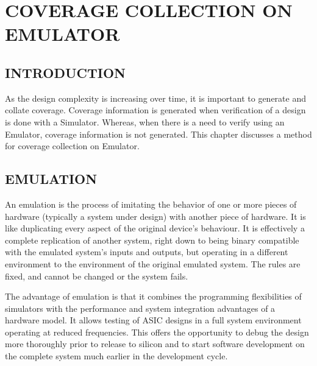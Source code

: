 \chapter{COVERAGE COLLECTION ON EMULATOR}
\label{chap:coverage_on_emulator}

\section{INTRODUCTION}
As the design complexity is increasing over time, it is important to generate and collate coverage. Coverage information is generated when verification of a design is done with a Simulator. Whereas, when there is a need to verify using an Emulator, coverage information is not generated. This chapter discusses a method for coverage collection on Emulator.
\section{EMULATION}
An emulation is the process of imitating the behavior of one or more pieces of hardware (typically a system under design) with another piece of hardware. It is like duplicating every aspect of the original device’s behaviour. It is effectively a complete replication of another system, right down to being binary compatible with the emulated system's inputs and outputs, but operating in a different environment to the environment of the original emulated system. The rules are fixed, and cannot be changed or the system fails.

The advantage of emulation is that it combines the programming flexibilities of simulators with the performance and system integration advantages of a hardware model. It allows testing of ASIC designs in a full system environment operating at reduced frequencies. This offers the opportunity to debug the design more thoroughly prior to release to silicon and to start software development on the complete system much earlier in the development cycle.

